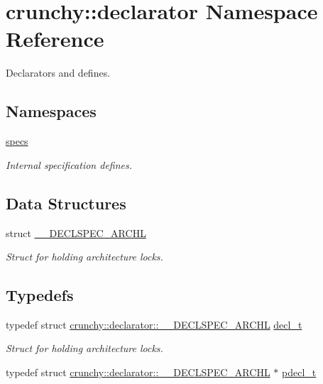 \hypertarget{namespacecrunchy_1_1declarator}{}\section{crunchy\+:\+:declarator Namespace Reference}
\label{namespacecrunchy_1_1declarator}


Declarators and defines.  


\subsection*{Namespaces}
\begin{DoxyCompactItemize}
\item 
 \hyperlink{namespacecrunchy_1_1declarator_1_1specs}{specs}
\begin{DoxyCompactList}\small\item\em Internal specification defines. \end{DoxyCompactList}\end{DoxyCompactItemize}
\subsection*{Data Structures}
\begin{DoxyCompactItemize}
\item 
struct \hyperlink{structcrunchy_1_1declarator_1_1_____d_e_c_l_s_p_e_c___a_r_c_h_l}{\+\_\+\+\_\+\+D\+E\+C\+L\+S\+P\+E\+C\+\_\+\+A\+R\+C\+HL}
\begin{DoxyCompactList}\small\item\em Struct for holding architecture locks. \end{DoxyCompactList}\end{DoxyCompactItemize}
\subsection*{Typedefs}
\begin{DoxyCompactItemize}
\item 
typedef struct \hyperlink{structcrunchy_1_1declarator_1_1_____d_e_c_l_s_p_e_c___a_r_c_h_l}{crunchy\+::declarator\+::\+\_\+\+\_\+\+D\+E\+C\+L\+S\+P\+E\+C\+\_\+\+A\+R\+C\+HL} \hyperlink{namespacecrunchy_1_1declarator_a0f9bbabe1552349f0ee0ae228ed30bb2}{decl\+\_\+t}
\begin{DoxyCompactList}\small\item\em Struct for holding architecture locks. \end{DoxyCompactList}\item 
typedef struct \hyperlink{structcrunchy_1_1declarator_1_1_____d_e_c_l_s_p_e_c___a_r_c_h_l}{crunchy\+::declarator\+::\+\_\+\+\_\+\+D\+E\+C\+L\+S\+P\+E\+C\+\_\+\+A\+R\+C\+HL} $\ast$ \hyperlink{namespacecrunchy_1_1declarator_a518adbd030268ca7f676cfe5c5ee7624}{pdecl\+\_\+t}
\end{DoxyCompactItemize}
